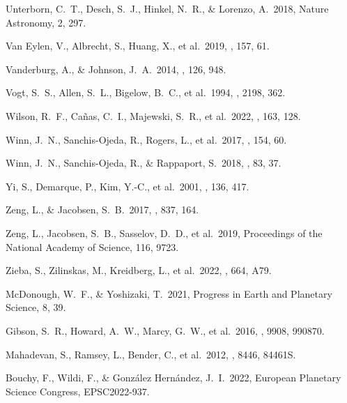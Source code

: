  Unterborn, C.~T., Desch, S.~J., Hinkel, N.~R., \& Lorenzo, A.\ 2018, Nature Astronomy, 2, 297.

 Van Eylen, V., Albrecht, S., Huang, X., et al.\ 2019, \aj, 157, 61.

 Vanderburg, A., \& Johnson, J.~A.\ 2014, \pasp, 126, 948.

 Vogt, S.~S., Allen, S.~L., Bigelow, B.~C., et al.\ 1994, \procspie, 2198, 362.

 Wilson, R.~F., Ca{\~n}as, C.~I., Majewski, S.~R., et al.\ 2022, \aj, 163, 128.

 Winn, J.~N., Sanchis-Ojeda, R., Rogers, L., et al.\ 2017, \aj, 154, 60.

 Winn, J.~N., Sanchis-Ojeda, R., \& Rappaport, S.\ 2018, \nar, 83, 37.

 Yi, S., Demarque, P., Kim, Y.-C., et al.\ 2001, \apjs, 136, 417.

 Zeng, L., \& Jacobsen, S.~B.\ 2017, \apj, 837, 164.

 Zeng, L., Jacobsen, S.~B., Sasselov, D.~D., et al.\ 2019, Proceedings of the National Academy of Science, 116, 9723.

 Zieba, S., Zilinskas, M., Kreidberg, L., et al.\ 2022, \aap, 664, A79.


 McDonough, W.~F., \& Yoshizaki, T.\ 2021, Progress in Earth and Planetary Science, 8, 39.



 Gibson, S.~R., Howard, A.~W., Marcy, G.~W., et al.\ 2016, \procspie, 9908, 990870.

 Mahadevan, S., Ramsey, L., Bender, C., et al.\ 2012, \procspie, 8446, 84461S.

 Bouchy, F., Wildi, F., \& Gonz{\'a}lez Hern{\'a}ndez, J.~I.\ 2022, European Planetary Science Congress, EPSC2022-937.

